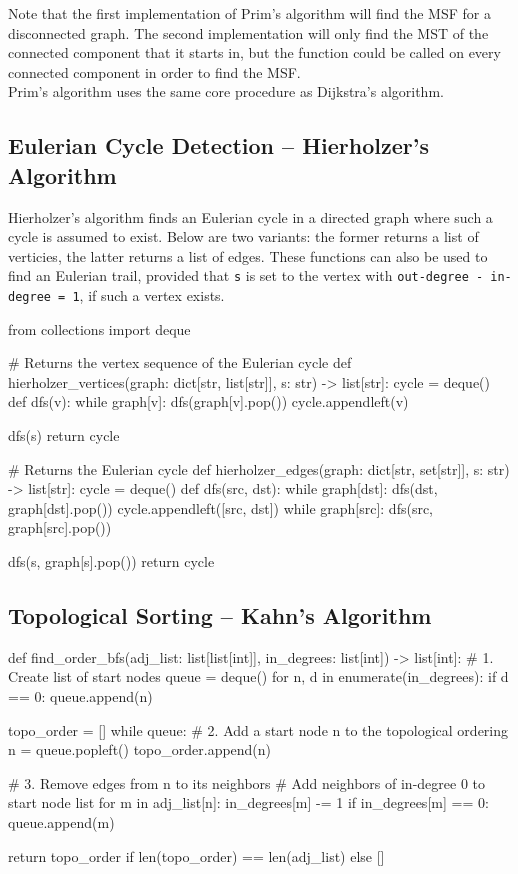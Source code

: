 \documentclass[12pt, titlepage]{article}
\begin{document}
Note that the first implementation of Prim's algorithm will find the MSF for a disconnected graph. The second implementation will only find the MST of the connected component that it starts in, but the function could be called on every connected component in order to find the MSF. \\

Prim's algorithm uses the same core procedure as Dijkstra's algorithm.

\subsection{Eulerian Cycle Detection -- Hierholzer's Algorithm} \label{hierholzer}

Hierholzer's algorithm finds an Eulerian cycle in a directed graph where such a cycle is assumed to exist. Below are two variants: the former returns a list of verticies, the latter returns a list of edges. These functions can also be used to find an Eulerian trail, provided that \texttt{s} is set to the vertex with \texttt{out-degree - in-degree = 1}, if such a vertex exists. \medskip

\begin{python}
from collections import deque

# Returns the vertex sequence of the Eulerian cycle
def hierholzer_vertices(graph: dict[str, list[str]], s: str) -> list[str]:
    cycle = deque()
    def dfs(v):
        while graph[v]:
            dfs(graph[v].pop())
        cycle.appendleft(v)

    dfs(s)
    return cycle


# Returns the Eulerian cycle
def hierholzer_edges(graph: dict[str, set[str]], s: str) -> list[str]:
    cycle = deque()
    def dfs(src, dst):
        while graph[dst]:
            dfs(dst, graph[dst].pop())
        cycle.appendleft([src, dst])
        while graph[src]:
            dfs(src, graph[src].pop())

    dfs(s, graph[s].pop())
    return cycle
\end{python}

\subsection{Topological Sorting -- Kahn's Algorithm} \label{kahn}
\begin{python}
def find_order_bfs(adj_list: list[list[int]],
                   in_degrees: list[int]) -> list[int]:
    # 1. Create list of start nodes
    queue = deque()
    for n, d in enumerate(in_degrees):
        if d == 0:
            queue.append(n)

    topo_order = []
    while queue:
        # 2. Add a start node n to the topological ordering
        n = queue.popleft()
        topo_order.append(n)

        # 3. Remove edges from n to its neighbors
        #    Add neighbors of in-degree 0 to start node list
        for m in adj_list[n]:
            in_degrees[m] -= 1
            if in_degrees[m] == 0:
                queue.append(m)

    return topo_order if len(topo_order) == len(adj_list) else []
\end{python}
\end{document}
